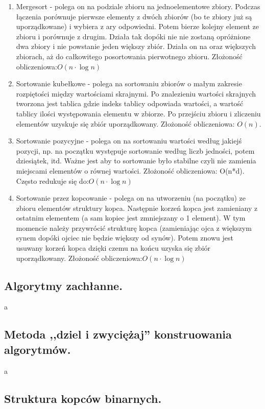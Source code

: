\documentclass[a4paper,12pt,oneside]{book}
\begin{document}
\begin{enumerate}
					(pesymistyczna): $O(n^2)$. W praktyce złożoność obliczeniowa jest bliska: $O(n\cdot\log n)$
					\item Mergesort - polega on na podziale zbioru na jednoelementowe zbiory. Podczas
					łączenia porównuje pierwsze elementy z dwóch zbiorów (bo te zbiory już są
					uporządkowane) i wybiera z ary odpowiedni. Potem bierze kolejny element ze zbioru
					i porównuje z drugim. Działa tak dopóki nie nie zostaną opróżnione dwa zbiory i nie
					powstanie jeden większy zbiór. Działa on na oraz większych zbiorach, aż do
					całkowitego posortowania pierwotnego zbioru. Złożoność obliczeniowa:$O(n\cdot\log n)$
					\item Sortowanie kubełkowe - polega na sortowaniu zbiorów o małym zakresie
					rozpiętości między wartościami skrajnymi. Po znalezieniu wartości skrajnych
					tworzona jest tablica gdzie indeks tablicy odpowiada wartości, a wartość tablicy ilości
					występowania elementu w zbiorze. Po przejściu zbioru i zliczeniu elementów
					uzyskuje się zbiór uporządkowany. Złożoność obliczeniowa: $O(n)$.
					\item Sortowanie pozycyjne - polega on na sortowaniu wartości według jakiejś pozycji,
					np. na początku występuje sortowanie według liczb jedności, potem dziesiątek, itd.
					Ważne jest aby to sortowanie było stabilne czyli nie zamienia miejscami elementów o
					równej wartości. Złożoność obliczeniowa: O(n*d). Często redukuje się do:$O(n\cdot\log n)$
					\item Sortowanie przez kopcowanie - polega on na utworzeniu (na początku) ze zbioru
					elementów struktury kopca. Następnie korzeń kopca jest zamieniany z ostatnim
					elementem (a sam kopiec jest zmniejszany o 1 element). W tym momencie należy
					przywrócić strukturę kopca (zamieniając ojca z większym synem dopóki ojciec nie
					będzie większy od synów). Potem znowu jest usuwany korzeń kopca dzięki czemu
					na końcu uzyska się zbiór uporządkowany. Złożoność obliczeniowa:$O(n\cdot\log n)$
				\end{enumerate}
			\newpage\subsection{\color{red}Algorytmy zachłanne.}
				a
			\newpage\subsection{\color{red}Metoda ,,dziel i zwyciężaj'' konstruowania algorytmów.}
				a
			\newpage\subsection{\color{red}Struktura kopców binarnych.}
\end{document}

